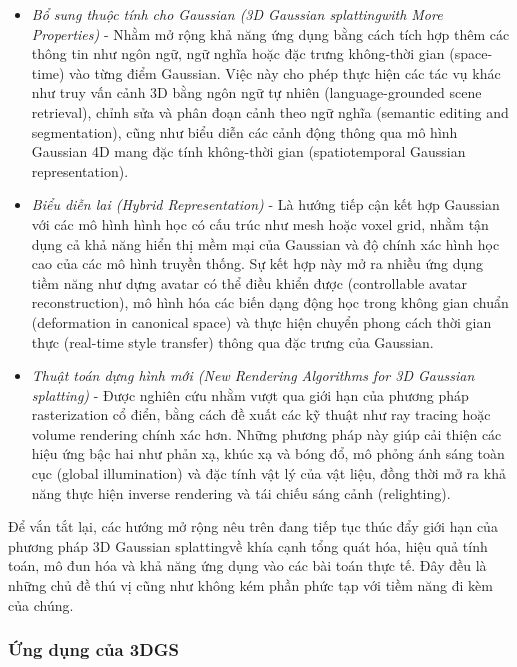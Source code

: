 \begin{itemize}
        \item \textit{Bổ sung thuộc tính cho Gaussian (3D Gaussian splattingwith More Properties)} - Nhằm mở rộng khả năng ứng dụng bằng cách tích hợp thêm các thông tin như ngôn ngữ, ngữ nghĩa hoặc đặc trưng không-thời gian (space-time) vào từng điểm Gaussian. Việc này cho phép thực hiện các tác vụ khác như truy vấn cảnh 3D bằng ngôn ngữ tự nhiên (language-grounded scene retrieval), chỉnh sửa và phân đoạn cảnh theo ngữ nghĩa (semantic editing and segmentation), cũng như biểu diễn các cảnh động thông qua mô hình Gaussian 4D mang đặc tính không-thời gian (spatiotemporal Gaussian representation).\\
        
        \item \textit{Biểu diễn lai (Hybrid Representation)} - Là hướng tiếp cận kết hợp Gaussian với các mô hình hình học có cấu trúc như mesh hoặc voxel grid, nhằm tận dụng cả khả năng hiển thị mềm mại của Gaussian và độ chính xác hình học cao của các mô hình truyền thống. Sự kết hợp này mở ra nhiều ứng dụng tiềm năng như dựng avatar có thể điều khiển được (controllable avatar reconstruction), mô hình hóa các biến dạng động học trong không gian chuẩn (deformation in canonical space) và thực hiện chuyển phong cách thời gian thực (real-time style transfer) thông qua đặc trưng của Gaussian.\\
        
        \item \textit{Thuật toán dựng hình mới (New Rendering Algorithms for 3D Gaussian splatting)} - Được nghiên cứu nhằm vượt qua giới hạn của phương pháp rasterization cổ điển, bằng cách đề xuất các kỹ thuật như ray tracing hoặc volume rendering chính xác hơn. Những phương pháp này giúp cải thiện các hiệu ứng bậc hai như phản xạ, khúc xạ và bóng đổ, mô phỏng ánh sáng toàn cục (global illumination) và đặc tính vật lý của vật liệu, đồng thời mở ra khả năng thực hiện inverse rendering và tái chiếu sáng cảnh (relighting).

        \end{itemize}
        Để vắn tắt lại, các hướng mở rộng nêu trên đang tiếp tục thúc đẩy giới hạn của phương pháp 3D Gaussian splattingvề khía cạnh tổng quát hóa, hiệu quả tính toán, mô đun hóa và khả năng ứng dụng vào các bài toán thực tế. Đây đều là những chủ đề thú vị cũng như không kém phần phức tạp với tiềm năng đi kèm của chúng.
        
        \subsubsection{Ứng dụng của 3DGS}

